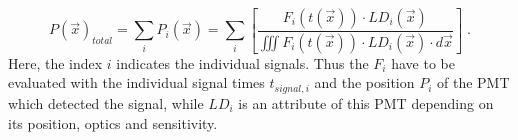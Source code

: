   \begin{equation}
     P(\vec{x})_{total} = \sum_{i} P_i(\vec{x}) = \sum_{i} \left[ \frac{F_i(t(\vec{x})) \cdot LD_i(\vec{x})}{\iiint F_i(t(\vec{x})) \cdot LD_i(\vec{x})  \cdot d\vec{x}} \right] \; .
  \end{equation}
  Here, the index $i$ indicates the individual signals. Thus the $F_i$ have to be evaluated with the individual signal times $t_{signal, i}$ 
  and the position $P_i$ of the PMT which detected the signal, 
  while $LD_i$ is an attribute of this PMT depending on its position, optics and sensitivity. 
  
